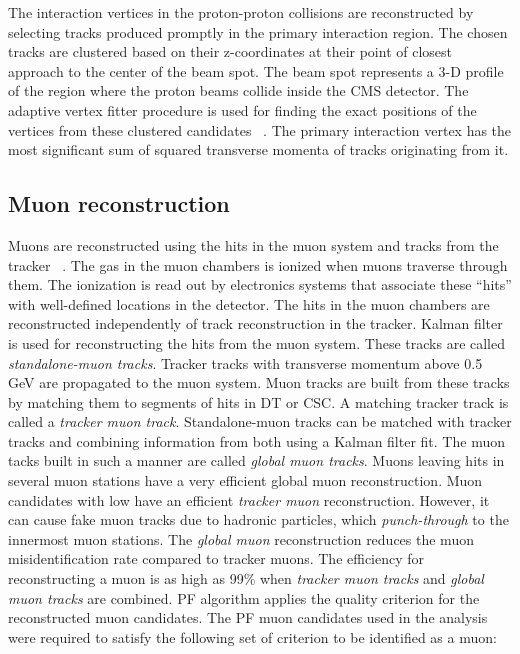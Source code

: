 The interaction vertices in the proton-proton collisions are reconstructed by selecting tracks produced promptly in the primary interaction region. The chosen tracks are clustered based on their z-coordinates at their point of closest approach to the center of the beam spot. The beam spot represents a 3-D profile of the region where the proton beams collide inside the CMS detector. The adaptive vertex fitter procedure is used for finding the exact positions of the vertices from these clustered candidates ~\cite{Fruhwirth:2007hz}. The primary interaction vertex has the most significant sum of squared transverse momenta of tracks originating from it.

\subsection{Muon reconstruction}
\label{mu_recon}

Muons are reconstructed using the hits in the muon system and tracks from the tracker ~\cite{Sirunyan:2018fpa}. The gas in the muon chambers is ionized when muons traverse through them. The ionization is read out by electronics systems that associate these ``hits'' with well-defined locations in the detector. The hits in the muon chambers are reconstructed independently of track reconstruction in the tracker. Kalman filter is used for reconstructing the hits from the muon system. These tracks are called \textit{standalone-muon tracks}.
Tracker tracks with transverse momentum above 0.5 GeV are propagated to the muon system. Muon tracks are built from these tracks by matching them to segments of hits in DT or CSC. A matching tracker track is called a \textit{tracker muon track}. Standalone-muon tracks can be matched with tracker tracks and combining information from both using a Kalman filter fit. The muon tacks built in such a manner are called \textit{global muon tracks}. Muons leaving hits in several muon stations have a very efficient global muon reconstruction. Muon candidates with low \pt have an efficient \textit{tracker muon} reconstruction. However, it can cause fake muon tracks due to hadronic particles, which \textit{punch-through} to the innermost muon stations. The \textit{global muon} reconstruction reduces the muon misidentification rate compared to tracker muons. The efficiency for reconstructing a muon is as high as 99\% when \textit{tracker muon tracks} and \textit{global muon tracks} are combined. PF algorithm applies the quality criterion for the reconstructed muon candidates. The PF muon candidates used in the analysis were required to satisfy the following set of criterion to be identified as a muon:

